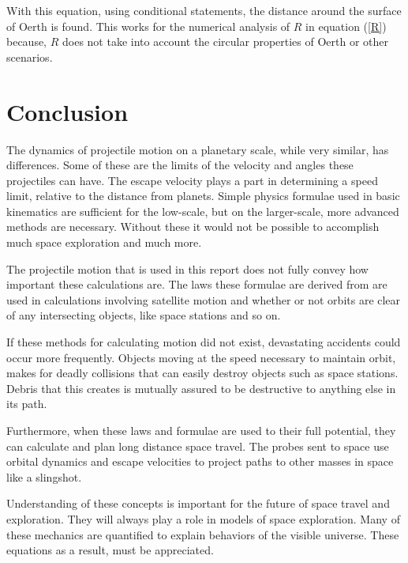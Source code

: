 \documentclass[12pt]{extarticle}
\begin{document}
With this equation, using conditional statements, the distance around the surface of Oerth is found. This works for the numerical analysis of $R$ in equation (\ref{R}) because, $R$ does not take into account the circular properties of Oerth or other scenarios.

\section{Conclusion}

The dynamics of projectile motion on a planetary scale, while very similar, has differences. Some of these are the limits of the velocity and angles these projectiles can have. The escape velocity plays a part in determining a speed limit, relative to the distance from planets. Simple physics formulae used in basic kinematics are sufficient for the low-scale, but on the larger-scale, more advanced methods are necessary. Without these it would not be possible to accomplish much space exploration and much more.

The projectile motion that is used in this report does not fully convey how important these calculations are. The laws these formulae are derived from are used in calculations involving satellite motion and whether or not orbits are clear of any intersecting objects, like space stations and so on. 

If these methods for calculating motion did not exist, devastating accidents could occur more frequently. Objects moving at the speed necessary to maintain orbit, makes for deadly collisions that can easily destroy objects such as space stations. Debris that this creates is mutually assured to be destructive to anything else in its path.

Furthermore, when these laws and formulae are used to their full potential, they can calculate and plan long distance space travel. The probes sent to space use orbital dynamics and escape velocities to project paths to other masses in space like a slingshot.

Understanding of these concepts is important for the future of space travel and exploration. They will always play a role in models of space exploration. Many of these mechanics are quantified to explain behaviors of the visible universe. These equations as a result, must be appreciated.
\newpage

\lstset{basicstyle=\footnotesize,breaklines=true}
\lstset{framextopmargin=50pt,frame=bottomline}
\end{document}
